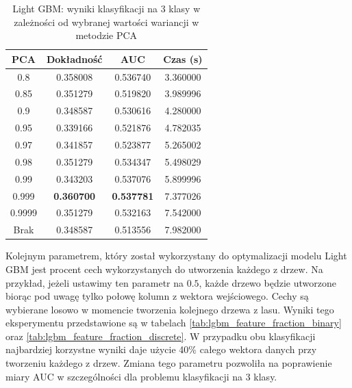 \documentclass[a4paper, twoside, 11pt, openright]{article}
\begin{document}
\begin{table}[H]
    \centering
    \begin{tabular}{|c|c|c|c|}
    \hline
        \textbf{PCA} & \textbf{Dokładność} & \textbf{AUC} & \textbf{Czas (s)} \\ \hline
0.8                &  0.358008 &  0.536740 &    3.360000 \\ \hline
0.85               &  0.351279 &  0.519820 &    3.989996 \\ \hline
0.9                &  0.348587 &  0.530616 &    4.280000 \\ \hline
0.95               &  0.339166 &  0.521876 &    4.782035 \\ \hline
0.97               &  0.341857 &  0.523877 &    5.265002 \\ \hline
0.98               &  0.351279 &  0.534347 &    5.498029 \\ \hline
0.99               &  0.343203 &  0.537076 &    5.899996 \\ \hline
0.999			   &  \textbf{0.360700} &   \textbf{0.537781} &    7.377026 \\ \hline
0.9999             &  0.351279 &  0.532163 &    7.542000 \\ \hline
Brak                &  0.348587 &  0.513556 &    7.982000 \\ \hline
    \end{tabular}
    \caption{Light GBM: wyniki klasyfikacji na 3 klasy w zależności od wybranej wartości wariancji w metodzie PCA}
    \label{tab:lgbm_pca_discrete}
\end{table}

Kolejnym parametrem, który został wykorzystany do optymalizacji modelu Light GBM jest procent cech wykorzystanych do utworzenia każdego z drzew. Na przykład, jeżeli ustawimy ten parametr na $0.5$, każde drzewo będzie utworzone biorąc pod uwagę tylko połowę kolumn z wektora wejściowego. Cechy są wybierane losowo w momencie tworzenia kolejnego drzewa z lasu. Wyniki tego eksperymentu przedstawione są w tabelach \ref{tab:lgbm_feature_fraction_binary} oraz \ref{tab:lgbm_feature_fraction_discrete}. W przypadku obu klasyfikacji najbardziej korzystne wyniki daje użycie 40\% całego wektora danych przy tworzeniu każdego z drzew. Zmiana tego parametru pozwoliła na poprawienie miary AUC w szczególności dla problemu klasyfikacji na 3 klasy.
\end{document}
